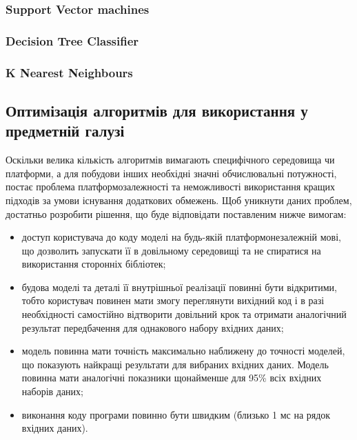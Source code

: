 \subsubsection{Support Vector machines}

\subsubsection{Decision Tree Classifier}

\subsubsection{K Nearest Neighbours}



\subsection{Оптимізація алгоритмів для використання у предметній галузі}
Оскільки велика кількість алгоритмів вимагають специфічного середовища чи платформи, а для побудови інших необхідні значні обчислювальні потужності, постає проблема платформозалежності та неможливості використання кращих підходів за умови існування додаткових обмежень. Щоб уникнути даних проблем, достатньо розробити рішення, що буде відповідати поставленим нижче вимогам:
\begin{itemize}  
	\item доступ користувача до коду моделі на будь-якій платформонезалежній мові, що дозволить запускати її в довільному середовищі та не спиратися на використання сторонніх бібліотек;
	\item будова моделі та деталі її внутрішньої реалізації повинні бути відкритими, тобто користувач повинен мати змогу переглянути вихідний код і в разі необхідності самостійно відтворити довільний крок та отримати аналогічний результат передбачення для однакового набору вхідних даних;
	\item модель повинна мати точність максимально наближену до точності моделей, що показують найкращі результати для вибраних вхідних даних. Модель повинна мати аналогічні показники щонайменше для 95\% всіх вхідних наборів даних;
	\item виконання коду програми повинно бути швидким (близько 1 мс на рядок вхідних даних).
\end{itemize}

